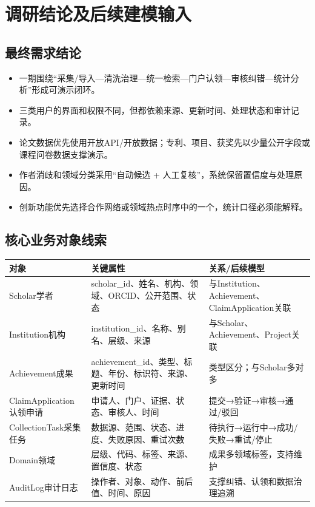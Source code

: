 \documentclass[UTF8,11pt,a4paper]{ctexart}
\begin{document}
\section{调研结论及后续建模输入}
\subsection{最终需求结论}
\begin{itemize}
\item 一期围绕“采集/导入—清洗治理—统一检索—门户认领—审核纠错—统计分析”形成可演示闭环。
\item 三类用户的界面和权限不同，但都依赖来源、更新时间、处理状态和审计记录。
\item 论文数据优先使用开放API/开放数据；专利、项目、获奖先以少量公开字段或课程问卷数据支撑演示。
\item 作者消歧和领域分类采用“自动候选 + 人工复核”，系统保留置信度与处理原因。
\item 创新功能优先选择合作网络或领域热点时序中的一个，统计口径必须能解释。
\end{itemize}

\subsection{核心业务对象线索}
\begin{longtable}{p{2.6cm}p{5.0cm}p{6.7cm}}
\toprule 对象 & 关键属性 & 关系/后续模型\\\midrule
Scholar学者 & scholar\_id、姓名、机构、领域、ORCID、公开范围、状态 & 与Institution、Achievement、ClaimApplication关联\\
Institution机构 & institution\_id、名称、别名、层级、来源 & 与Scholar、Achievement、Project关联\\
Achievement成果 & achievement\_id、类型、标题、年份、标识符、来源、更新时间 & 类型区分；与Scholar多对多\\
ClaimApplication认领申请 & 申请人、门户、证据、状态、审核人、时间 & 提交→验证→审核→通过/驳回\\
CollectionTask采集任务 & 数据源、范围、状态、进度、失败原因、重试次数 & 待执行→运行中→成功/失败→重试/停止\\
Domain领域 & 层级、代码、标签、来源、置信度、状态 & 成果多领域标签，支持维护\\
AuditLog审计日志 & 操作者、对象、动作、前后值、时间、原因 & 支撑纠错、认领和数据治理追溯\\\bottomrule
\end{longtable}
\end{document}
